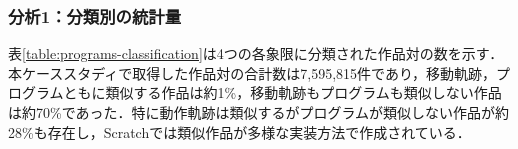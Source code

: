 \documentclass[T,J]{fose} %
\newcommand{\todo}[1]{\colorbox{yellow}{{\bf TODO}:}{\color{red} {\textbf{[#1]}}}}
\begin{document}






\subsubsection{分析1：分類別の統計量}

表\ref{table:programs-classification}は4つの各象限に分類された作品対の数を示す．本ケーススタディで取得した作品対の合計数は7,595,815件であり，移動軌跡，プログラムともに類似する作品は約1\%，移動軌跡もプログラムも類似しない作品は約70\%であった．特に動作軌跡は類似するがプログラムが類似しない作品が約28\%も存在し，Scratchでは類似作品が多様な実装方法で作成されている．


\end{document}
